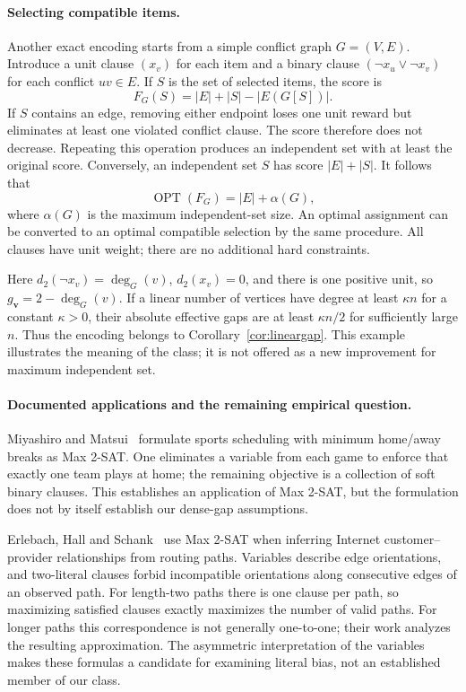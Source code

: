 \documentclass[11pt,a4paper]{article}
\theoremstyle{definition}
\theoremstyle{remark}
\newcommand{\OPT}{\operatorname{OPT}}
\begin{document}
\paragraph{Selecting compatible items.}
Another exact encoding starts from a simple conflict graph $G=(V,E)$.
Introduce a unit clause $(x_v)$ for each item and a binary clause
$(\neg x_u\vee\neg x_v)$ for each conflict $uv\in E$. If $S$ is the set
of selected items, the score is
\[
 F_G(S)=|E|+|S|-|E(G[S])|.
\]
If $S$ contains an edge, removing either endpoint loses one unit reward but
eliminates at least one violated conflict clause. The score therefore does
not decrease. Repeating this operation produces an independent set with
at least the original score. Conversely, an independent set $S$ has score
$|E|+|S|$. It follows that
\[
 \OPT(F_G)=|E|+\alpha(G),
\]
where $\alpha(G)$ is the maximum independent-set size. An optimal assignment
can be converted to an optimal compatible selection by the same procedure.
All clauses have unit weight; there are no additional hard constraints.

Here $d_2(\neg x_v)=\deg_G(v)$, $d_2(x_v)=0$, and there is one positive
unit, so $g_{\mathbf v}=2-\deg_G(v)$. If a linear number of vertices have degree at
least $\kappa n$ for a constant $\kappa>0$, their absolute effective gaps
are at least $\kappa n/2$ for sufficiently large $n$. Thus the encoding
belongs to Corollary~\ref{cor:lineargap}. This example illustrates the
meaning of the class; it is not offered as a new improvement for maximum
independent set.

\paragraph{Documented applications and the remaining empirical question.}
Miyashiro and Matsui~\cite{MM03} formulate sports scheduling with minimum
home/away breaks as Max 2-SAT. One eliminates a variable from each game to
enforce that exactly one team plays at home; the remaining objective is a
collection of soft binary clauses. This establishes an application of Max
2-SAT, but the formulation does not by itself establish our dense-gap
assumptions.

Erlebach, Hall and Schank~\cite{EHS02} use Max 2-SAT when inferring Internet
customer--provider relationships from routing paths. Variables describe
edge orientations, and two-literal clauses forbid incompatible orientations
along consecutive edges of an observed path. For length-two paths there
is one clause per path, so maximizing satisfied clauses exactly maximizes
the number of valid paths. For longer paths this correspondence is not
generally one-to-one; their work analyzes the resulting approximation.
The asymmetric interpretation of the variables makes these formulas a
candidate for examining literal bias, not an established member of our
class.
\end{document}
